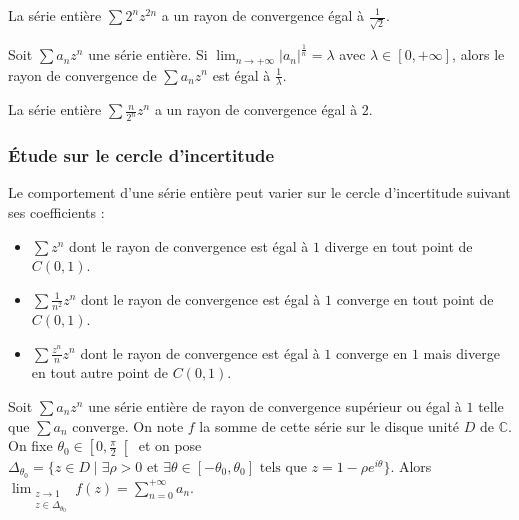   \begin{example}
    La série entière $\sum 2^n z^{2n}$ a un rayon de convergence égal à $\frac{1}{\sqrt{2}}$.
  \end{example}

  \begin{corollary}
    Soit $\sum a_n z^n$ une série entière. Si $\lim_{n \rightarrow +\infty} \left| a_n \right|^{\frac{1}{n}} = \lambda$ avec $\lambda \in [0, +\infty]$, alors le rayon de convergence de $\sum a_n z^n$ est égal à $\frac{1}{\lambda}$.
  \end{corollary}

  \begin{example}
    La série entière $\sum \frac{n}{2^n} z^n$ a un rayon de convergence égal à $2$.
  \end{example}

  \subsubsection{Étude sur le cercle d'incertitude}


  \begin{example}
    Le comportement d'une série entière peut varier sur le cercle d'incertitude suivant ses coefficients :
    \begin{itemize}
      \item $\sum z^n$ dont le rayon de convergence est égal à $1$ diverge en tout point de $C(0,1)$.
      \item $\sum \frac{1}{n^2} z^n$ dont le rayon de convergence est égal à $1$ converge en tout point de $C(0,1)$.
      \item $\sum \frac{z^n}{n} z^n$ dont le rayon de convergence est égal à $1$ converge en $1$ mais diverge en tout autre point de $C(0,1)$.
    \end{itemize}
  \end{example}


  \begin{theorem}
    \label{243-1}
    Soit $\sum a_n z^n$ une série entière de rayon de convergence supérieur ou égal à $1$ telle que $\sum a_n$ converge. On note $f$ la somme de cette série sur le disque unité $D$ de $\mathbb{C}$. On fixe $\theta_0 \in \left[ 0, \frac{\pi}{2} \right[$ et on pose $\Delta_{\theta_0} = \{ z \in D \mid \exists \rho > 0 \text{ et } \exists \theta \in [-\theta_0, \theta_0] \text{ tels que } z = 1 - \rho e^{i\theta} \}$.
    \newpar
    Alors $\lim_{\substack{z \rightarrow 1 \\ z \in \Delta_{\theta_0}}} f(z) = \sum_{n=0}^{+\infty} a_n$.
  \end{theorem}

